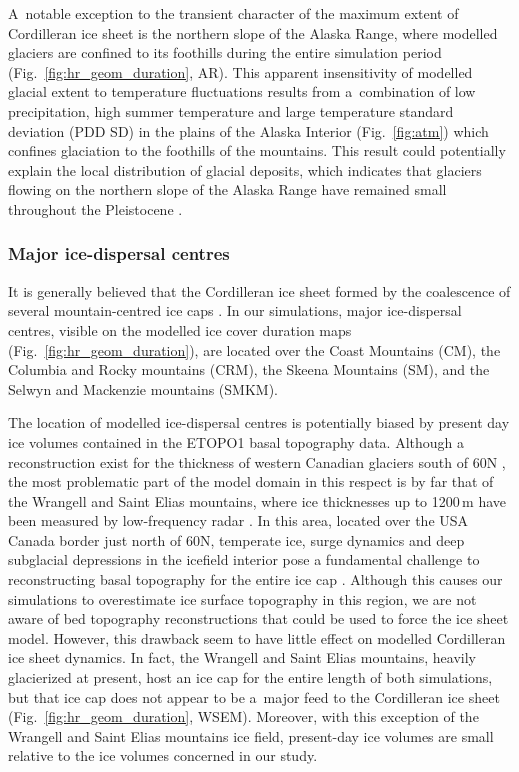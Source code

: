 \documentclass[tc, manuscript]{copernicus}
\begin{document}
      A~notable exception to the transient character of the maximum extent
      of Cordilleran ice sheet is the northern slope of the Alaska Range,
      where modelled glaciers are confined to its foothills during the
      entire simulation period (Fig.~\ref{fig:hr_geom_duration}, AR). This
      apparent insensitivity of modelled glacial extent to temperature
      fluctuations results from a~combination of low precipitation, high
      summer temperature and large temperature standard deviation (PDD SD)
      in the plains of the Alaska Interior (Fig.~\ref{fig:atm}) which
      confines glaciation to the foothills of the mountains. This result
      could potentially explain the local distribution of glacial deposits,
      which indicates that glaciers flowing on the northern slope of the
      Alaska Range have remained small throughout the Pleistocene
      \citep{Kaufman.Manley.2004}.

\subsubsection{Major ice-dispersal centres}

      It is generally believed that the Cordilleran ice sheet formed by the
      coalescence of several mountain-centred ice caps
      \citep{Davis.Mathews.1944}. In our simulations, major ice-dispersal
      centres, visible on the modelled ice cover duration maps
      (Fig.~\ref{fig:hr_geom_duration}), are located over the Coast
      Mountains (CM), the Columbia and Rocky mountains (CRM), the Skeena
      Mountains (SM), and the Selwyn and Mackenzie mountains (SMKM).

      The location of modelled ice-dispersal centres is potentially biased
      by present day ice volumes contained in the ETOPO1 basal topography
      data. Although a reconstruction exist for the thickness of western
      Canadian glaciers south of 60{\degree}N \citep{Clarke.etal.2013}, the
      most problematic part of the model domain in this respect is by far
      that of the Wrangell and Saint Elias mountains, where ice thicknesses
      up to 1200\,m have been measured by low-frequency radar
      \citep{Rignot.etal.2013}. In this area, located over the USA Canada
      border just north of 60{\degree}N, temperate ice, surge dynamics and
      deep subglacial depressions in the icefield interior pose a
      fundamental challenge to reconstructing basal topography for the
      entire ice cap \citep{Rignot.etal.2013}. Although this causes our
      simulations to overestimate ice surface topography in this region, we
      are not aware of bed topography reconstructions that could be used to
      force the ice sheet model. However, this drawback seem to have
      little effect on modelled Cordilleran ice sheet dynamics. In fact, the
      Wrangell and Saint Elias mountains, heavily glacierized at present,
      host an ice cap for the entire length of both simulations, but that
      ice cap does not appear to be a~major feed to the Cordilleran ice
      sheet (Fig.~\ref{fig:hr_geom_duration}, WSEM). Moreover, with this
      exception of the Wrangell and Saint Elias mountains ice field,
      present-day ice volumes are small relative to the ice volumes
      concerned in our study.
\end{document}
